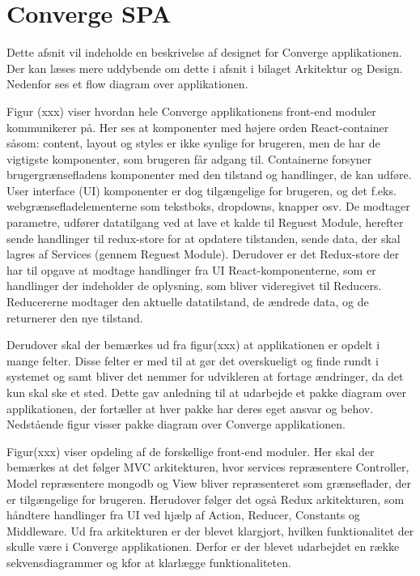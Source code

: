 \section{Converge SPA}

Dette afsnit vil indeholde en beskrivelse af designet for Converge applikationen. Der kan læses mere uddybende om dette i afsnit  i bilaget Arkitektur og Design. Nedenfor ses et flow diagram over applikationen. 


Figur (xxx) viser hvordan hele Converge applikationens front-end moduler kommunikerer på. Her ses at komponenter med højere orden React-container såsom: content, layout og styles er ikke synlige for brugeren, men de har de vigtigste komponenter, som brugeren får adgang til. Containerne forsyner brugergrænsefladens komponenter med den tilstand og handlinger, de kan udføre. 
User interface (UI) komponenter er dog tilgængelige for brugeren, og det f.eks. webgrænsefladelementerne som tekstboks, dropdowns, knapper osv. De modtager parametre, udfører datatilgang ved at lave et kalde til Reguest Module, herefter sende handlinger til redux-store for at opdatere tilstanden, sende data, der skal lagres af Services (gennem Reguest Module). 
Derudover er det Redux-store der har til opgave at modtage handlinger fra UI React-komponenterne, som er handlinger der indeholder de oplysning, som bliver videregivet til Reducers. Reducererne modtager den aktuelle datatilstand, de ændrede data, og de returnerer den nye tilstand. 

Derudover skal der bemærkes ud fra figur(xxx) at applikationen er opdelt i mange felter. Disse felter er med til at gør det overskueligt og finde rundt i systemet og samt bliver det nemmer for udvikleren at fortage ændringer, da det kun skal ske et sted. Dette gav anledning til at udarbejde et pakke diagram over applikationen, der fortæller at hver pakke har deres eget ansvar og behov. Nedstående figur visser pakke diagram over Converge applikationen. 


Figur(xxx) viser opdeling af de forskellige front-end moduler. Her skal der bemærkes at det følger MVC arkitekturen, hvor services repræsentere Controller, Model repræsentere mongodb og View bliver repræsenteret som grænseflader, der er tilgængelige for brugeren. Herudover følger det også Redux arkitekturen, som håndtere handlinger fra UI ved hjælp af Action, Reducer, Constants og Middleware.    
Ud fra arkitekturen er der blevet klargjort, hvilken funktionalitet der skulle være i Converge applikationen. Derfor er der blevet udarbejdet en række sekvensdiagrammer og kfor at klarlægge funktionaliteten. 